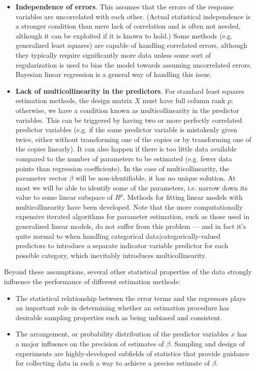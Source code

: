 \begin{itemize}
  \item \textbf{Independence of errors}.  This assumes that the errors of the response variables are uncorrelated with each other. (Actual statistical independence is a stronger condition than mere lack of correlation and is often not needed, although it can be exploited if it is known to hold.) Some methods (e.g. generalized least squares) are capable of handling correlated errors, although they typically require significantly more data unless some sort of regularization is used to bias the model towards assuming uncorrelated errors. Bayesian linear regression is a general way of handling this issue.

  \item \textbf{Lack of multicollinearity in the predictors}.  For standard least squares estimation methods, the design matrix $X$ must have full column rank $p$; otherwise, we have a condition known as multicollinearity in the predictor variables.  This can be triggered by having two or more perfectly correlated predictor variables (e.g. if the same predictor variable is mistakenly given twice, either without transforming one of the copies or by transforming one of the copies linearly). It can also happen if there is too little data available compared to the number of parameters to be estimated (e.g. fewer data points than regression coefficients). In the case of multicollinearity, the parameter vector $\beta$ will be non-identifiable, it has no unique solution.  At most we will be able to identify some of the parameters, i.e. narrow down its value to some linear subspace of $R^p$. Methods for fitting linear models with multicollinearity have been developed. Note that the more computationally expensive iterated algorithms for parameter estimation, such as those used in generalized linear models, do not suffer from this problem — and in fact it's quite normal to when handling categorical data|categorically-valued predictors to introduce a separate indicator variable predictor for each possible category, which inevitably introduces multicollinearity.
\end{itemize}
Beyond these assumptions, several other statistical properties of the data strongly influence the performance of different estimation methods:

\begin{itemize}
  \item The statistical relationship between the error terms and the regressors plays an important role in determining whether an estimation procedure has desirable sampling properties such as being unbiased and consistent.
  \item The arrangement, or probability distribution of the predictor variables $x$ has a major influence on the precision of estimates of $\beta$. Sampling and design of experiments are highly-developed subfields of statistics that provide guidance for collecting data in such a way to achieve a precise estimate of $\beta$.
\end{itemize}

